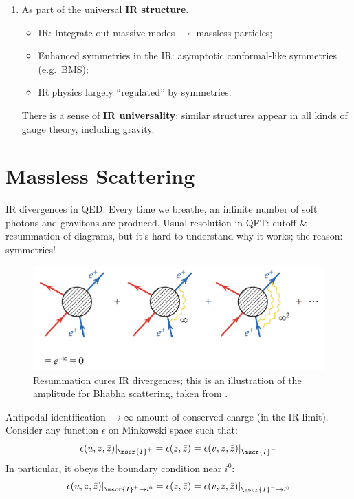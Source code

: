 \documentclass[a4paper
	,10pt
]{article}
\begin{document}
\begin{enumerate}
	
	\item As part of the universal \textbf{IR structure}. 
	
	\begin{itemize}[noitemsep]
	\item IR: Integrate out massive modes $\to$ massless particles;
	
	\item Enhanced symmetries in the IR: asymptotic conformal-like symmetries (e.g.~BMS);
	
	\item IR physics largely ``regulated'' by symmetries.
	
	\end{itemize}
	
	There is a sense of \textbf{IR universality}: similar structures appear in all kinds of gauge theory, including gravity. 
	
	
	\end{enumerate}
	
\section{Massless Scattering}
	
	IR divergences in QED: Every time we breathe, an infinite number of soft photons and gravitons are produced. Usual resolution in QFT: cutoff \& resummation of diagrams, but it's hard to understand why it works; the reason: symmetries!
	\begin{figure}[!ht]
	\centering
	\includegraphics[width=.7\linewidth]{img/Resum.png}
	\caption[Resummation cures IR divergences]{
		Resummation cures IR divergences; this is an illustration of the amplitude for Bhabha scattering, taken from \cite{Strominger:2017zoo}. 
	}
	\end{figure}
	
	Antipodal identification $\to \infty$ amount of conserved charge (in the IR limit). Consider any function $\epsilon$ on Minkowski space such that:
	\begin{equation}
		\epsilon(u,z,\bar{z})|_{\mscr{I}^+}
		= \epsilon(z,\bar{z})
		= \epsilon(v,z,\bar{z})|_{\mscr{I}^-}
	\end{equation}
	In particular, it obeys the boundary condition near $i^0$:
	\begin{equation}
		\epsilon(u,z,\bar{z})|_{\mscr{I}^+\to i^0}
		= \epsilon(z,\bar{z})
		= \epsilon(v,z,\bar{z})|_{\mscr{I}^-\to i^0}
	\end{equation}
	
\end{document}
